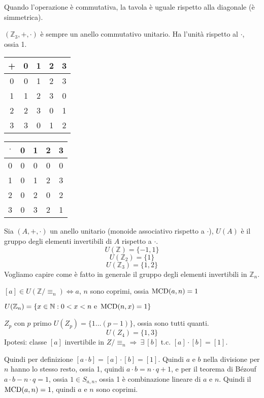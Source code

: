 Quando l'operazione \`e commutativa, la tavola \`e uguale rispetto alla diagonale (\`e simmetrica).

$(\mathbb{Z}_3, +, \cdot)$ \`e sempre un anello commutativo unitario. Ha l'unit\`a rispetto al $\cdot$, ossia 1.

\begin{tabular}{c|cccc}
+ & 0 & 1 & 2 & 3 \\
\hline
0 & 0 & 1 & 2 & 3 \\
1 & 1 & 2 & 3 & 0 \\
2 & 2 & 3 & 0 & 1 \\
3 & 3 & 0 & 1 & 2
\end{tabular}

\begin{tabular}{c|cccc}
$\cdot$ & 0 & 1 & 2 & 3 \\
\hline
0 & 0 & 0 & 0 & 0 \\
1 & 0 & 1 & 2 & 3 \\
2 & 0 & 2 & 0 & 2 \\
3 & 0 & 3 & 2 & 1
\end{tabular}

Sia $(A, +, \cdot)$ un anello unitario (monoide associativo rispetto a $\cdot$), $U(A)$ \`e il gruppo degli elementi invertibili di $A$ rispetto a $\cdot$.
\[
U(\mathbb{Z}) = \{ -1, 1 \}
\]
\[
U(\mathbb{Z}_2) = \{ 1 \}
\]
\[
U(\mathbb{Z}_3) = \{ 1,  2 \}
\]
Vogliamo capire come \`e fatto in generale il gruppo degli elementi invertibili in $\mathbb{Z}_n$.

\begin{prop}
$[a] \in U(\mathbb{Z} / \equiv_n) \Leftrightarrow a$, $n$ sono coprimi, ossia $\operatorname{MCD}(a, n) = 1$
\end{prop}

\begin{cor}
$U(\mathbb{Z}_n) = \{ x \in \mathbb{N} : 0 < x < n \text{ e } \operatorname{MCD}(n, x) = 1\}$
\end{cor}

$Z_p$ con $p$ primo $U(Z_p) = \{ 1 \dots (p-1)\}$, ossia sono tutti quanti.
\[
U(Z_4) = \{1, 3\}
\]
Ipotesi: classe $[a]$ invertibile in $Z / \equiv_n \Rightarrow \ \exists \ [b]$ t.c. $[a] \cdot [b] = [1]$. 

Quindi per definizione $[a \cdot b] = [a] \cdot [b] = [1]$. Quindi $a$ e $b$ nella divisione per $n$ hanno lo stesso resto, ossia 1, quindi $a \cdot b = n \cdot q + 1$, e per il teorema di B\'ezouf $a \cdot b - n \cdot q = 1$, ossia $1 \in S_{a, n}$, ossia 1 \`e combinazione lineare di $a$ e $n$. Quindi il $\operatorname{MCD}(a, n) = 1$, quindi $a$ e $n$ sono coprimi.

